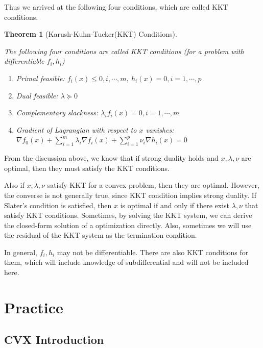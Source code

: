 \documentclass[
]{book}
\providecommand{\tightlist}{%
  \setlength{\itemsep}{0pt}\setlength{\parskip}{0pt}}
\newtheorem{theorem}{Theorem}[chapter]
\theoremstyle{definition}
\theoremstyle{definition}
\theoremstyle{definition}
\theoremstyle{definition}
\theoremstyle{remark}
\begin{document}
Thus we arrived at the following four conditions, which are called KKT conditions.

\begin{theorem}[Karush-Kuhn-Tucker(KKT) Conditions]
\protect\hypertarget{thm:KKT}{}\label{thm:KKT}

The following four conditions are called KKT conditions (for a problem with differentiable \(f_i,h_i\))

\begin{enumerate}
\def\labelenumi{\arabic{enumi}.}
\tightlist
\item
  Primal feasible: \(f_i(x) \leq 0,i,\cdots ,m,\ h_i(x) = 0,i=1,\cdots ,p\)
\item
  Dual feasible: \(\lambda\succeq0\)
\item
  Complementary slackness: \(\lambda_if_i(x)=0,i=1,\cdots,m\)
\item
  Gradient of Lagrangian with respect to \(x\) vanishes:\(\nabla f_0(x)+\sum_{i=1}^m\lambda_i\nabla f_i(x)+\sum_{i=1}^p\nu_i\nabla h_i(x) = 0\)
\end{enumerate}

\end{theorem}

From the discussion above, we know that if strong duality holds and \(x,\lambda,\nu\) are optimal, then they must satisfy the KKT conditions.

Also if \(x,\lambda,\nu\) satisfy KKT for a convex problem, then they are optimal. However, the converse is not generally true, since KKT condition implies strong duality. If Slater's condition is satisfied, then \(x\) is optimal if and only if there exist \(\lambda,\nu\) that satisfy KKT conditions. Sometimes, by solving the KKT system, we can derive the closed-form solution of a optimization directly. Also, sometimes we will use the residual of the KKT system as the termination condition.

In general, \(f_i,h_i\) may not be differentiable. There are also KKT conditions for them, which will include knowledge of subdifferential and will not be included here.

\section{Practice}\label{appconvex-practice}

\subsection{CVX Introduction}\label{cvx-introduction}
\end{document}
